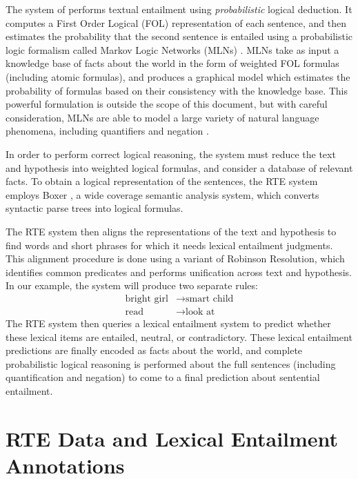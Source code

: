 The system of  performs textual
entailment using {\em probabilistic} logical deduction. It
computes a First Order Logical (FOL) representation of each sentence, and
then estimates the probability that the second sentence is entailed
using a probabilistic logic formalism called
Markov Logic Networks (MLNs) \cite{richardson:2006:ml}. MLNs take as input a
knowledge base of facts about the world in the form of weighted FOL formulas (including
atomic formulas), and produces a graphical model which estimates the probability
of formulas based on their consistency with the knowledge base.
This powerful formulation is outside
the scope of this document, but with careful consideration, MLNs are able
to model a large variety of natural language phenomena, including
quantifiers and negation \cite{beltagy:2016:phd}.

In order to perform correct logical reasoning, the system must reduce
the text and hypothesis into weighted logical formulas, and consider a database of
relevant facts. To obtain a logical representation of the sentences, the
RTE system employs Boxer \cite{bos:2008:step}, a wide coverage semantic analysis system, which converts syntactic parse
trees into logical formulas.

The RTE system then aligns the representations of the text and hypothesis to find words and
short phrases for which it needs lexical entailment judgments. This alignment
procedure is done using a variant of Robinson Resolution, which identifies
common predicates and performs unification across text and hypothesis.
In our example, the system will produce two separate rules:
\begin{align*}
  \mbox{bright girl} & \rightarrow \mbox{smart child}\\
  \mbox{read} & \rightarrow \mbox{look at}
\end{align*}
The RTE system then queries a lexical entailment system to predict whether
these lexical items are entailed, neutral, or contradictory. These lexical
entailment predictions are finally encoded as facts about the world, and
complete probabilistic logical reasoning is performed about the full sentences
(including quantification and negation) to come to a final prediction about
sentential entailment.

\section{RTE Data and Lexical Entailment Annotations}

